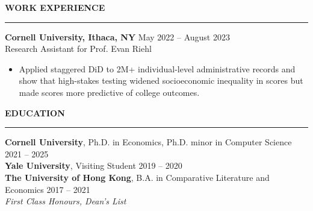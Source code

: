 \documentclass{resume} %
\def\sectionskip{\vspace{2pt}}
\def\sectionlineskip{\vspace{2pt}}
\renewenvironment{rSection}[1]{%
  \sectionskip
  \MakeUppercase{\bf #1}%
  \sectionlineskip
  \hrule
  \begin{list}{}{%
    \setlength{\leftmargin}{1.5em}%
    \setlength{\topsep}{3pt}%
    \setlength{\partopsep}{0pt}%
  }%
  \item[]
}{%
  \end{list}%
}
\begin{document}
\begin{rSection}{Work Experience}
  {\bf Cornell University, Ithaca, NY} \hfill {May 2022 -- August 2023} \\
  Research Assistant for Prof. Evan Riehl \vspace{-0.5em}
  \begin{itemize}[label={\tiny\raisebox{1ex}{\textbullet}}]
    \itemsep-0.5em 
    \item Applied staggered DiD to 2M+ individual-level administrative records and show that high-stakes testing widened socioeconomic inequality in scores but made scores more predictive of college outcomes.
  \end{itemize} 
  
\end{rSection}


\begin{rSection}{Education}
{\bf Cornell University}, Ph.D. in Economics, Ph.D. minor in Computer Science \hfill {2021 -- 2025} \\
{\bf Yale University}, Visiting Student \hfill {2019 -- 2020} \\
{\bf The University of Hong Kong}, B.A. in Comparative Literature and Economics  \hfill {2017 -- 2021}
\\ \emph{First Class Honours, Dean's List}

\end{rSection}


\end{document}
